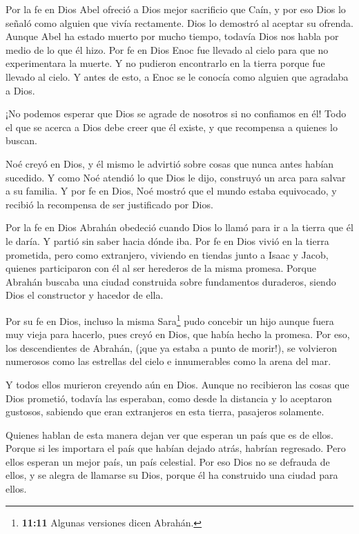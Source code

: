  Por la fe en Dios Abel ofreció a Dios mejor sacrificio que
Caín, y por eso Dios lo señaló como alguien que vivía rectamente. Dios
lo demostró al aceptar su ofrenda. Aunque Abel ha estado muerto por
mucho tiempo, todavía Dios nos habla por medio de lo que él hizo.
 Por fe en Dios Enoc fue llevado al cielo para que no
experimentara la muerte. Y no pudieron encontrarlo en la tierra porque
fue llevado al cielo. Y antes de esto, a Enoc se le conocía como alguien
que agradaba a Dios.

 ¡No podemos esperar que Dios se agrade de nosotros si no
confiamos en él! Todo el que se acerca a Dios debe creer que él existe,
y que recompensa a quienes lo buscan.

 Noé creyó en Dios, y él mismo le advirtió sobre cosas que
nunca antes habían sucedido. Y como Noé atendió lo que Dios le dijo,
construyó un arca para salvar a su familia. Y por fe en Dios, Noé mostró
que el mundo estaba equivocado, y recibió la recompensa de ser
justificado por Dios.

 Por la fe en Dios Abrahán obedeció cuando Dios lo llamó
para ir a la tierra que él le daría. Y partió sin saber hacia dónde iba.
 Por fe en Dios vivió en la tierra prometida, pero como
extranjero, viviendo en tiendas junto a Isaac y Jacob, quienes
participaron con él al ser herederos de la misma promesa. 
Porque Abrahán buscaba una ciudad construida sobre fundamentos
duraderos, siendo Dios el constructor y hacedor de ella.

 Por su fe en Dios, incluso la misma Sara\footnote{\textbf{11:11}
  Algunas versiones dicen Abrahán.} pudo concebir un hijo aunque fuera
muy vieja para hacerlo, pues creyó en Dios, que había hecho la promesa.
 Por eso, los descendientes de Abrahán, (¡que ya estaba a
punto de morir!), se volvieron numerosos como las estrellas del cielo e
innumerables como la arena del mar.

 Y todos ellos murieron creyendo aún en Dios. Aunque no
recibieron las cosas que Dios prometió, todavía las esperaban, como
desde la distancia y lo aceptaron gustosos, sabiendo que eran
extranjeros en esta tierra, pasajeros solamente.

 Quienes hablan de esta manera dejan ver que esperan un
país que es de ellos.  Porque si les importara el país que
habían dejado atrás, habrían regresado.  Pero ellos esperan
un mejor país, un país celestial. Por eso Dios no se defrauda de ellos,
y se alegra de llamarse su Dios, porque él ha construido una ciudad para
ellos.


